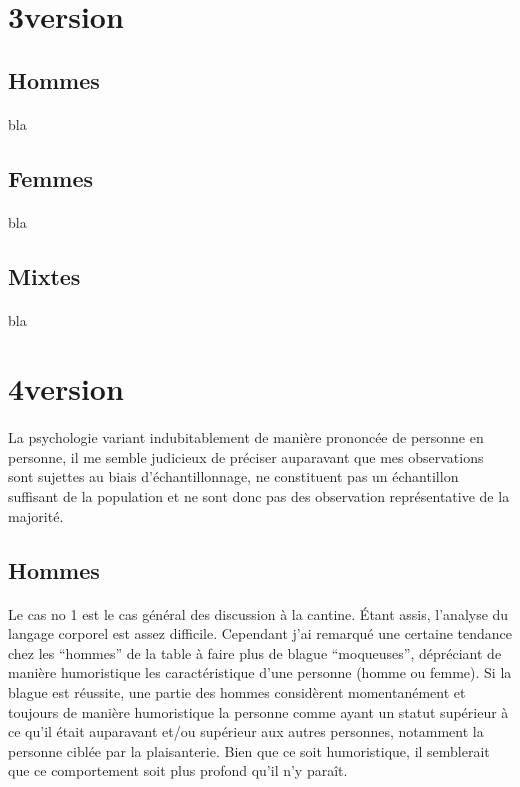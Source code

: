 \section{3\ieme version}
\paragraph{}
\subsection{Hommes}
\paragraph{}
bla

\subsection{Femmes}
\paragraph{}
bla

\subsection{Mixtes}
\paragraph{}
bla

\section{4\ieme version}
\paragraph{}
La psychologie variant indubitablement de manière prononcée de personne en
personne, il me semble judicieux de préciser auparavant que mes observations
sont sujettes au biais d’échantillonnage, ne constituent pas un échantillon suffisant de la population et ne sont donc pas des observation représentative de la majorité.

\subsection{Hommes}
\paragraph{}
Le cas no 1 est le cas général des discussion à la cantine. Étant assis, l’analyse du langage corporel est assez difficile. Cependant j’ai remarqué une certaine tendance chez les “hommes” de la table à faire plus de blague “moqueuses”, dépréciant de manière humoristique les caractéristique d’une personne (homme ou femme). Si la blague est réussite, une partie des hommes considèrent momentanément et toujours de manière humoristique la personne comme ayant un statut supérieur à ce qu’il était auparavant et/ou supérieur aux autres personnes, notamment la personne ciblée par la plaisanterie. Bien que ce soit humoristique, il semblerait que ce comportement soit plus profond qu’il n’y paraît.

